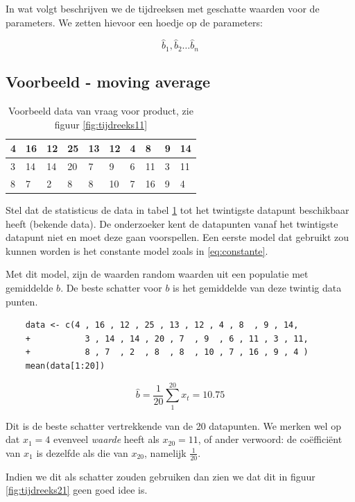 In wat volgt beschrijven we de tijdreeksen met geschatte waarden voor de parameters. We zetten hievoor een hoedje op de parameters:

\[ \widehat{b}_{1}, \widehat{b}_{2} \dots \widehat{b}_{n} \] 

\subsection{Voorbeeld - moving average}

\begin{table}[t]
\centering
    \begin{tabular}{|l|l|l|l|l|l|l|l|l|l|}
    \hline
    4 & 16 & 12 & 25 & 13 & 12 & 4 & 8  & 9 & 14 \\ \hline
    3 & 14 & 14 & 20 & 7  & 9  & 6 & 11 & 3 & 11 \\ \hline
    8 & 7  & 2  & 8  & 8  & 10 & 7 & 16 & 9 & 4  \\ \hline
    \end{tabular}
    \caption{Voorbeeld data van vraag voor product, zie figuur \ref{fig:tijdreeks11}}
    \label{tab:data}
\end{table}

Stel dat de statisticus de data in tabel \ref{tab:data} tot het twintigste datapunt beschikbaar heeft (bekende data). De onderzoeker kent de datapunten vanaf het twintigste datapunt niet en moet deze gaan voorspellen. Een eerste model dat gebruikt zou kunnen worden is het constante model zoals in \ref{eq:constante}. 

Met dit model, zijn de waarden random waarden uit een populatie met gemiddelde $b$. De beste schatter voor $b$ is het gemiddelde van deze twintig data punten. 

\begin{lstlisting}
	data <- c(4 , 16 , 12 , 25 , 13 , 12 , 4 , 8  , 9 , 14, 
	+           3 , 14 , 14 , 20 , 7  , 9  , 6 , 11 , 3 , 11, 
	+           8 , 7  , 2  , 8  , 8  , 10 , 7 , 16 , 9 , 4 )
	mean(data[1:20])
\end{lstlisting}

\[ \widehat{b} = \frac{1}{20} \sum_{1}^{20} x_{t}= 10.75 \] 

Dit is de beste schatter vertrekkende van de 20 datapunten. We merken wel op dat $x_{1} =  4$ evenveel \textit{waarde} heeft als $x_{20} = 11$, of ander verwoord: de co\"effici\"ent van  $x_{1}$ is dezelfde als die van $x_{20}$, namelijk $\frac{1}{20}$.

Indien we dit als schatter zouden gebruiken dan zien we dat dit in figuur \ref{fig:tijdreeks21} geen goed idee is.

